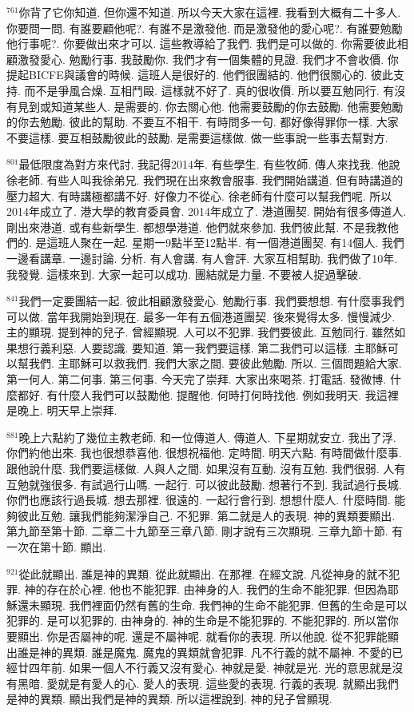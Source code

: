 \documentclass{book}
\begin{document}
$^{761}$你背了它你知道.
但你還不知道.
所以今天大家在這裡.
我看到大概有二十多人.
你要問一問.
有誰要顧他呢?.
有誰不是激發他.
而是激發他的愛心呢?.
有誰要勉勵他行事呢?.
你要做出來才可以.
這些教導給了我們.
我們是可以做的.
你需要彼此相顧激發愛心.
勉勵行事.
我鼓勵你.
我們才有一個集體的見證.
我們才不會收價.
你提起BICFE與議會的時候.
這班人是很好的.
他們很團結的.
他們很關心的.
彼此支持.
而不是爭風合燥.
互相鬥毆.
這樣就不好了.
真的很收價.
所以要互勉同行.
有沒有見到或知道某些人.
是需要的.
你去關心他.
他需要鼓勵的你去鼓勵.
他需要勉勵的你去勉勵.
彼此的幫助.
不要互不相干.
有時問多一句.
都好像得罪你一樣.
大家不要這樣.
要互相鼓勵彼此的鼓勵.
是需要這樣做.
做一些事說一些事去幫對方.

$^{801}$最低限度為對方來代討.
我記得2014年.
有些學生.
有些牧師.
傳人來找我.
他說徐老師.
有些人叫我徐弟兄.
我們現在出來教會服事.
我們開始講道.
但有時講道的壓力超大.
有時講極都講不好.
好像力不從心.
徐老師有什麼可以幫我們呢.
所以2014年成立了.
港大學的教育委員會.
2014年成立了.
港道團契.
開始有很多傳道人.
剛出來港道.
或有些新學生.
都想學港道.
他們就來參加.
我們彼此幫.
不是我教他們的.
是這班人聚在一起.
星期一9點半至12點半.
有一個港道團契.
有14個人.
我們一邊看講章.
一邊討論.
分析.
有人會講.
有人會評.
大家互相幫助.
我們做了10年.
我發覺.
這樣來到.
大家一起可以成功.
團結就是力量.
不要被人捉過擊破.

$^{841}$我們一定要團結一起.
彼此相顧激發愛心.
勉勵行事.
我們要想想.
有什麼事我們可以做.
當年我開始到現在.
最多一年有五個港道團契.
後來覺得太多.
慢慢減少.
主的顯現.
提到神的兒子.
曾經顯現.
人可以不犯罪.
我們要彼此.
互勉同行.
雖然如果想行義利惡.
人要認識.
要知道.
第一我們要這樣.
第二我們可以這樣.
主耶穌可以幫我們.
主耶穌可以救我們.
我們大家之間.
要彼此勉勵.
所以.
三個問題給大家.
第一何人.
第二何事.
第三何事.
今天完了崇拜.
大家出來喝茶.
打電話.
發微博.
什麼都好.
有什麼人我們可以鼓勵他.
提醒他.
何時打何時找他.
例如我明天.
我這裡是晚上.
明天早上崇拜.

$^{881}$晚上六點約了幾位主教老師.
和一位傳道人.
傳道人.
下星期就安立.
我出了浮.
你們約他出來.
我也很想恭喜他.
很想祝福他.
定時間.
明天六點.
有時間做什麼事.
跟他說什麼.
我們要這樣做.
人與人之間.
如果沒有互動.
沒有互勉.
我們很弱.
人有互勉就強很多.
有試過行山嗎.
一起行.
可以彼此鼓勵.
想著行不到.
我試過行長城.
你們也應該行過長城.
想去那裡.
很遠的.
一起行會行到.
想想什麼人.
什麼時間.
能夠彼此互勉.
讓我們能夠潔淨自己.
不犯罪.
第二就是人的表現.
神的異類要顯出.
第九節至第十節.
二章二十九節至三章八節.
剛才說有三次顯現.
三章九節十節.
有一次在第十節.
顯出.

$^{921}$從此就顯出.
誰是神的異類.
從此就顯出.
在那裡.
在經文說.
凡從神身的就不犯罪.
神的存在於心裡.
他也不能犯罪.
由神身的人.
我們的生命不能犯罪.
但因為耶穌還未顯現.
我們裡面仍然有舊的生命.
我們神的生命不能犯罪.
但舊的生命是可以犯罪的.
是可以犯罪的.
由神身的.
神的生命是不能犯罪的.
不能犯罪的.
所以當你要顯出.
你是否屬神的呢.
還是不屬神呢.
就看你的表現.
所以他說.
從不犯罪能顯出誰是神的異類.
誰是魔鬼.
魔鬼的異類就會犯罪.
凡不行義的就不屬神.
不愛的已經廿四年前.
如果一個人不行義又沒有愛心.
神就是愛.
神就是光.
光的意思就是沒有黑暗.
愛就是有愛人的心.
愛人的表現.
這些愛的表現.
行義的表現.
就顯出我們是神的異類.
顯出我們是神的異類.
所以這裡說到.
神的兒子曾顯現.
\end{document}
